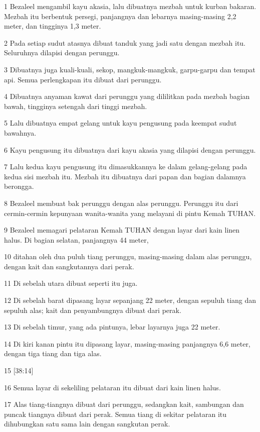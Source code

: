 \par 1 Bezaleel mengambil kayu akasia, lalu dibuatnya mezbah untuk kurban bakaran. Mezbah itu berbentuk persegi, panjangnya dan lebarnya masing-masing 2,2 meter, dan tingginya 1,3 meter.
\par 2 Pada setiap sudut atasnya dibuat tanduk yang jadi satu dengan mezbah itu. Seluruhnya dilapisi dengan perunggu.
\par 3 Dibuatnya juga kuali-kuali, sekop, mangkuk-mangkuk, garpu-garpu dan tempat api. Semua perlengkapan itu dibuat dari perunggu.
\par 4 Dibuatnya anyaman kawat dari perunggu yang dililitkan pada mezbah bagian bawah, tingginya setengah dari tinggi mezbah.
\par 5 Lalu dibuatnya empat gelang untuk kayu pengusung pada keempat sudut bawahnya.
\par 6 Kayu pengusung itu dibuatnya dari kayu akasia yang dilapisi dengan perunggu.
\par 7 Lalu kedua kayu pengusung itu dimasukkannya ke dalam gelang-gelang pada kedua sisi mezbah itu. Mezbah itu dibuatnya dari papan dan bagian dalamnya berongga.
\par 8 Bezaleel membuat bak perunggu dengan alas perunggu. Perunggu itu dari cermin-cermin kepunyaan wanita-wanita yang melayani di pintu Kemah TUHAN.
\par 9 Bezaleel memagari pelataran Kemah TUHAN dengan layar dari kain linen halus. Di bagian selatan, panjangnya 44 meter,
\par 10 ditahan oleh dua puluh tiang perunggu, masing-masing dalam alas perunggu, dengan kait dan sangkutannya dari perak.
\par 11 Di sebelah utara dibuat seperti itu juga.
\par 12 Di sebelah barat dipasang layar sepanjang 22 meter, dengan sepuluh tiang dan sepuluh alas; kait dan penyambungnya dibuat dari perak.
\par 13 Di sebelah timur, yang ada pintunya, lebar layarnya juga 22 meter.
\par 14 Di kiri kanan pintu itu dipasang layar, masing-masing panjangnya 6,6 meter, dengan tiga tiang dan tiga alas.
\par 15 [38:14]
\par 16 Semua layar di sekeliling pelataran itu dibuat dari kain linen halus.
\par 17 Alas tiang-tiangnya dibuat dari perunggu, sedangkan kait, sambungan dan puncak tiangnya dibuat dari perak. Semua tiang di sekitar pelataran itu dihubungkan satu sama lain dengan sangkutan perak.
